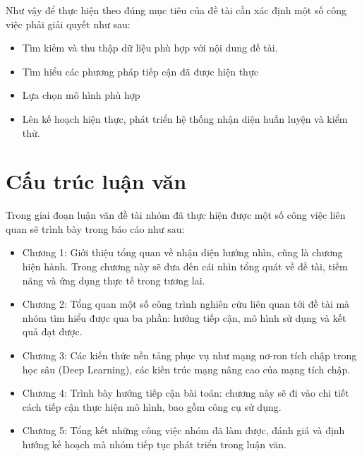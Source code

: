 Như vậy để thực hiện theo đúng mục tiêu của đề tài cần xác định một số công việc phải giải quyết như sau:
\begin{itemize}
    \item Tìm kiếm và thu thập dữ liệu phù hợp với nội dung đề tài.
    \item Tìm hiểu các phương pháp tiếp cận đã được hiện thực
    \item Lựa chọn mô hình phù hợp
    \item Lên kế hoạch hiện thực, phát triển hệ thống nhận diện huấn luyện và kiểm thử.
\end{itemize}
\section{Cấu trúc luận văn}
Trong giai đoạn luận văn đề tài nhóm đã thực hiện được một số công việc liên quan sẽ trình bày trong báo cáo như sau:

\begin{itemize}
    \item Chương 1: Giới thiệu tổng quan về nhận diện hướng nhìn, cũng là chương hiện hành. Trong chương này sẽ đưa đến cái nhìn tổng quát về đề tài, tiềm năng và ứng dụng thực tế trong tương lai.
    \item Chương 2: Tổng quan một số công trình nghiên cứu liên quan tới đề tài mà nhóm tìm hiểu được qua ba phần: hướng tiếp cận, mô hình sử dụng và kết quả đạt được.
    \item Chương 3: Các kiến thức nền tảng phục vụ như mạng nơ-ron tích chập trong học sâu (Deep Learning), các kiến trúc mạng nâng cao của mạng tích chập.
    \item Chương 4: Trình bày hướng tiếp cận bài toán: chương này sẽ đi vào chi tiết cách tiếp cận thực hiện mô hình, bao gồm công cụ sử dụng.
    \item Chương 5: Tổng kết những công việc nhóm đã làm được, đánh giá và định hướng kế hoạch mà nhóm tiếp tục phát triển trong luận văn.
\end{itemize}
